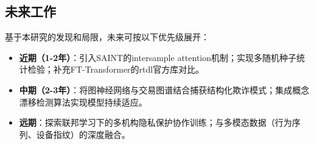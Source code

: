 \subsection{未来工作}

基于本研究的发现和局限，未来可按以下优先级展开：

\begin{itemize}
    \item \textbf{近期（1-2年）}：引入SAINT\cite{somepalli2022saint}的intersample attention机制；实现多随机种子统计检验；补充FT-Transformer的rtdl官方库对比。
    \item \textbf{中期（2-3年）}：将图神经网络与交易图谱结合捕获结构化欺诈模式；集成概念漂移检测算法实现模型持续适应。
    \item \textbf{远期}：探索联邦学习下的多机构隐私保护协作训练；与多模态数据（行为序列、设备指纹）的深度融合。
\end{itemize}
